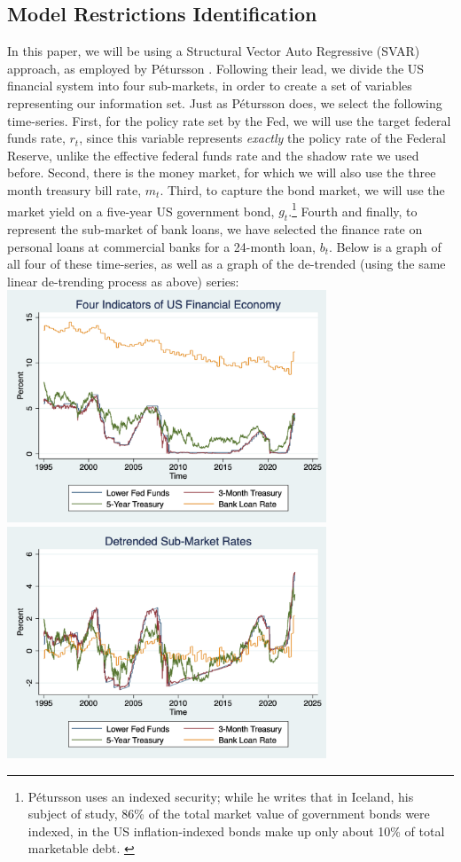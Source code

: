 \documentclass[12pt,final]{article}
\begin{document}
\subsection{Model Restrictions Identification}
In this paper, we will be using a Structural Vector Auto Regressive (SVAR) approach, as employed by Pétursson \citep{Petursson2001}. Following their lead, we divide the US financial system into four sub-markets, in order to create a set of variables representing our information set. Just as Pétursson does, we select the following time-series. First, for the policy rate set by the Fed, we will use the target federal funds rate, $r_t$, since this variable represents \textit{exactly} the policy rate of the Federal Reserve, unlike the effective federal funds rate and the shadow rate we used before. Second, there is the money market, for which we will also use the three month treasury bill rate, $m_t$. Third, to capture the bond market, we will use the market yield on a five-year US government bond, $g_t$.\footnote{Pétursson uses an indexed security; while he writes that in Iceland, his subject of study, 86\% of the total market value of government bonds were indexed, in the US inflation-indexed bonds make up only about 10\% of total marketable debt. \citep{Campbell2009}} Fourth and finally, to represent the sub-market of bank loans, we have selected the finance rate on personal loans at commercial banks for a 24-month loan, $b_t$. Below is a graph of all four of these time-series, as well as a graph of the de-trended (using the same linear de-trending process as above) series: \\
\includegraphics[width=3.75in]{svar_intro.png} \includegraphics[width=3.75in]{svar_detrend.png} \\
\end{document}
